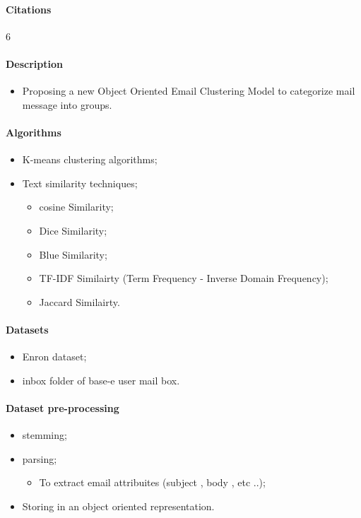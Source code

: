 \documentclass[12pt]{article}
\begin{document}
\paragraph{Citations}6
\paragraph{Description}
\begin{itemize}
    \item Proposing a new Object Oriented Email Clustering Model to categorize mail message into groups.
\end{itemize}

\paragraph{Algorithms}
\begin{itemize}
    \item K-means clustering algorithms;
    \item Text similarity techniques;
    \begin{itemize}
        \item cosine Similarity;
        \item Dice Similarity;
        \item Blue Similarity;
        \item TF-IDF Similairty (Term Frequency - Inverse Domain Frequency);
        \item Jaccard Similairty.
    \end{itemize}
\end{itemize}

\paragraph{Datasets}
\begin{itemize}
    \item Enron dataset;
    \item inbox folder of base-e user mail box.
\end{itemize}

\paragraph{Dataset pre-processing}
\begin{itemize}
    \item stemming;
    \item parsing;
    \begin{itemize}
        \item To extract email attribuites (subject , body , etc ..);
    \end{itemize}
    \item Storing in an object oriented representation.
\end{itemize}
\end{document}
